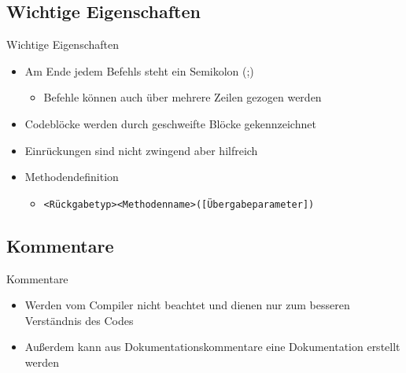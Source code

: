 \subsection{Wichtige Eigenschaften}
\begin{frame}{Wichtige Eigenschaften}
	\begin{itemize}
		\item Am Ende jedem Befehls steht ein Semikolon (;)
		\begin{itemize}
			\item Befehle können auch über mehrere Zeilen gezogen werden
		\end{itemize}
		\item Codeblöcke werden durch geschweifte Blöcke gekennzeichnet
		\item Einrückungen sind nicht zwingend aber hilfreich
		\item Methodendefinition
		\begin{itemize}
			\item \alert{\texttt{<Rückgabetyp><Methodenname>([Übergabeparameter])}}
		\end{itemize}
	\end{itemize}
\end{frame}

\subsection{Kommentare}
\begin{frame}{Kommentare}
	\begin{itemize}
		\item Werden vom Compiler nicht beachtet und dienen nur zum besseren Verständnis des Codes
		\item Außerdem kann aus Dokumentationskommentare eine Dokumentation erstellt werden
	\end{itemize}
	
\end{frame}

